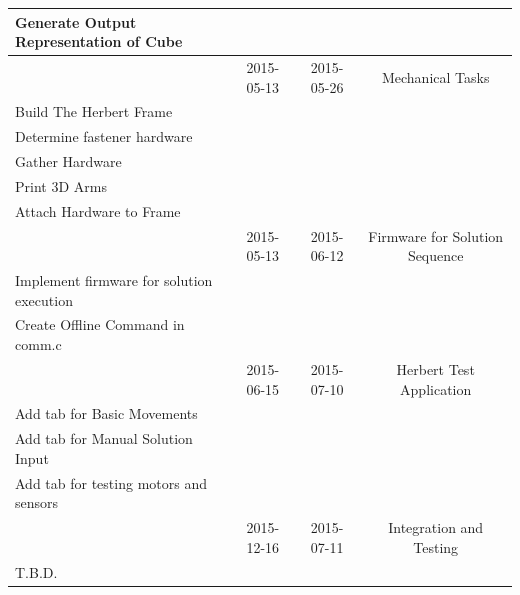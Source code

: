 \documentclass[final, letterpaper, 10 pt, conference, onecolumn]{IEEEtran}
\begin{document}
\begin{table}[!ht]
{\begin{tabular}{|l|c|c|c|}
Generate Output Representation of Cube    &                &                 &                                    \\ \hline
\textbf{}                                 & 2015-05-13     & 2015-05-26      & Mechanical Tasks                   \\ \hline
Build The Herbert Frame                   &                &                 &                                    \\ \hline
Determine fastener hardware               &                &                 &                                    \\ \hline
Gather Hardware                           &                &                 &                                    \\ \hline
Print 3D Arms                             &                &                 &                                    \\ \hline
Attach Hardware to Frame                  &                &                 &                                    \\ \hline
\textbf{}                                 & 2015-05-13     & 2015-06-12      & Firmware for Solution Sequence     \\ \hline
Implement firmware for solution execution &                &                 &                                    \\ \hline
Create Offline Command in comm.c          &                &                 &                                    \\ \hline
\textbf{}                                 & 2015-06-15     & 2015-07-10      & Herbert Test Application           \\ \hline
Add tab for Basic Movements               &                &                 &                                    \\ \hline
Add tab for Manual Solution Input         &                &                 &                                    \\ \hline
Add tab for testing motors and sensors    &                &                 &                                    \\ \hline
                                          & 2015-12-16     & 2015-07-11      & Integration and Testing            \\ \hline
T.B.D.                                    &                &                 &                                    \\ \hline
\end{tabular}}
\end{table}
\end{document}
